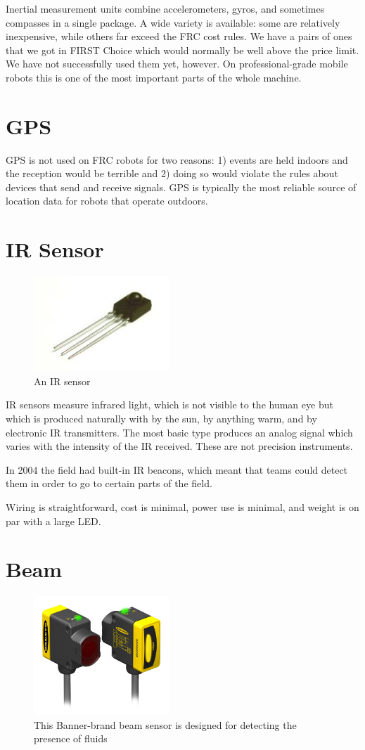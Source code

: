 \documentclass{article}
\begin{document}
Inertial measurement units combine accelerometers, gyros, and sometimes compasses in a single package.  A wide variety is available: some are relatively inexpensive, while others far exceed the FRC cost rules.  We have a pairs of ones that we got in FIRST Choice which would normally be well above the price limit.  We have not successfully used them yet, however.  On professional-grade mobile robots this is one of the most important parts of the whole machine.  

\section{GPS}
GPS is not used on FRC robots for two reasons: 1) events are held indoors and the reception would be terrible and 2) doing so would violate the rules about devices that send and receive signals.  GPS is typically the most reliable source of location data for robots that operate outdoors.  

\section{IR Sensor}
\begin{figure}[ht]
\centering
\includegraphics[width=2in]{ir_sensor.jpeg}
\caption{An IR sensor}
\end{figure}
IR sensors measure infrared light, which is not visible to the human eye but which is produced naturally with by the sun, by anything warm, and by electronic IR transmitters.  The most basic type produces an analog signal which varies with the intensity of the IR received.  These are not precision instruments.  

In 2004 the field had built-in IR beacons, which meant that teams could detect them in order to go to certain parts of the field.  

Wiring is straightforward, cost is minimal, power use is minimal, and weight is on par with a large LED.  

\section{Beam}
\begin{figure}[ht]
\centering
\includegraphics[width=2in]{beam.jpeg}
\caption{This Banner-brand beam sensor is designed for detecting the presence of fluids}
\end{figure}
\end{document}
